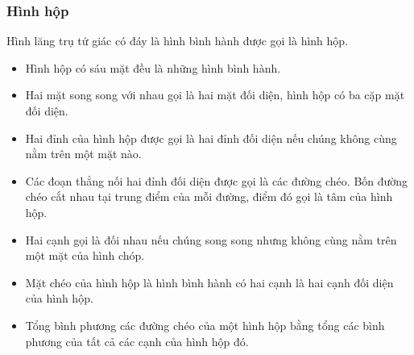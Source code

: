 \subsubsection{Hình hộp}
\begin{dn}
	Hình lăng trụ tứ giác có đáy là hình bình hành được gọi là hình hộp.
\end{dn}
\begin{center}
\end{center}
\begin{tc}
	\begin{itemize}
		\item Hình hộp có sáu mặt đều là những hình bình hành.
		\item Hai mặt song song với nhau gọi là hai mặt đối diện, hình hộp có ba cặp mặt đối diện.
		\item Hai đỉnh của hình hộp được gọi là hai đỉnh đối diện nếu chúng không cùng nằm trên một mặt nào.
		\item Các đoạn thẳng nối hai đỉnh đối diện được gọi là các đường chéo. Bốn đường chéo cắt nhau tại trung điểm của mỗi đường, điểm đó gọi là tâm của hình hộp.
		\item Hai cạnh gọi là đối nhau nếu chúng song song nhưng không cùng nằm trên một mặt của hình chóp.
		\item Mặt chéo của hình hộp là hình bình hành có hai cạnh là hai cạnh đối diện của hình hộp.
		\item Tổng bình phương các đường chéo của một hình hộp bằng tổng các bình phương của tất cả các cạnh của hình hộp đó.
	\end{itemize}
\end{tc}
